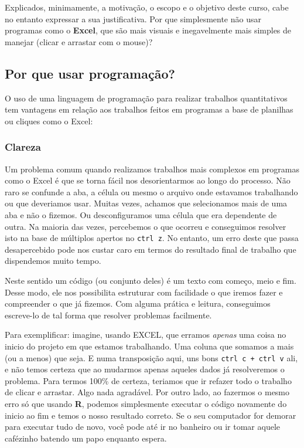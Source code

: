 \documentclass[
]{article}
\begin{document}
Explicados, minimamente, a motivação, o escopo e o objetivo deste curso,
cabe no entanto expressar a sua justificativa. Por que simplesmente não
usar programas como o \textbf{Excel}, que são mais visuais e
inegavelmente mais simples de manejar (clicar e arrastar com o mouse)?

\hypertarget{por-que-usar-programauxe7uxe3o}{%
\subsection{Por que usar
programação?}\label{por-que-usar-programauxe7uxe3o}}

O uso de uma linguagem de programação para realizar trabalhos
quantitativos tem vantagens em relação aos trabalhos feitos em programas
a base de planilhas ou cliques como o Excel:

\hypertarget{clareza}{%
\subsubsection{Clareza}\label{clareza}}

Um problema comum quando realizamos trabalhos mais complexos em
programas como o Excel é que se torna fácil nos desorientarmos ao longo
do processo. Não raro se confunde a aba, a célula ou mesmo o arquivo
onde estavamos trabalhando ou que deveriamos usar. Muitas vezes, achamos
que selecionamos mais de uma aba e não o fizemos. Ou desconfiguramos uma
célula que era dependente de outra. Na maioria das vezes, percebemos o
que ocorreu e conseguimos resolver isto na base de múltiplos apertos no
\texttt{ctrl\ z}. No entanto, um erro deste que passa desapercebido pode
nos custar caro em termos do resultado final de trabalho que dispendemos
muito tempo.

Neste sentido um código (ou conjunto deles) é um texto com começo, meio
e fim. Desse modo, ele nos possibilita estruturar com facilidade o que
iremos fazer e compreender o que já fizemos. Com alguma prática e
leitura, conseguimos escreve-lo de tal forma que resolver problemas
facilmente.

Para exemplificar: imagine, usando EXCEL, que erramos \emph{apenas} uma
coisa no inicio do projeto em que estamos trabalhando. Uma coluna que
somamos a mais (ou a menos) que seja. E numa transposição aqui, uns bons
\texttt{ctrl\ c\ +\ ctrl\ v} ali, e não temos certeza que ao mudarmos
apenas aqueles dados já resolveremos o problema. Para termos 100\% de
certeza, teriamos que ir refazer todo o trabalho de clicar e arrastar.
Algo nada agradável. Por outro lado, ao fazermos o mesmo erro só que
usando \textbf{R}, podemos simplesmente executar o código novamente do
inicio ao fim e temos o nosso resultado correto. Se o seu computador for
demorar para executar tudo de novo, você pode até ir no banheiro ou ir
tomar aquele cafézinho batendo um papo enquanto espera.
\end{document}
